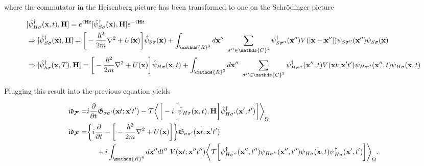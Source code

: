     where the commutator in the Heisenberg picture has been transformed to one on the Schr\"odinger picture 
    
    \begin{equation}
        \begin{split}
            & [\hat{\psi}^\dagger_{H \sigma}({\bf x}, t), {\bf H}] = e^{i{\bf H} t} [\hat{\psi}^\dagger_{ S \sigma}({\bf x}), {\bf H}] e^{-i{\bf H} t} \\
            & \Rightarrow [\hat{\psi}^\dagger_{ S \sigma}({\bf x}), {\bf H}] = \bigg[-\frac{\hbar^2}{2m} \nabla^2 + U({\bf x})\bigg] \hat{\psi}_{S \sigma}({\bf x})
            + \int_{\mathds{R}^3} d{\bf x}'' \blanky \sum_{\sigma'' \in \mathds{C}^2} \psi^\dagger_{S \sigma''}({\bf x}'') V(|{\bf x} - {\bf x}''|) \psi_{S \sigma''}({\bf x}'') \psi_{S \sigma}({\bf x}) \\
            & \Rightarrow [\hat{\psi}^\dagger_{ h \sigma}({\bf x}, T), {\bf H}] = \bigg[-\frac{\hbar^2}{2m} \nabla^2 + U({\bf x})\bigg] \hat{\psi}_{H \sigma}({\bf x}, t)
            + \int_{\mathds{R}^3} d{\bf x}'' \blanky \sum_{\sigma'' \in \mathds{C}^2} \psi^\dagger_{H \sigma''}({\bf x}'', t) V({\bf x}t; {\bf x}' t') \psi_{H \sigma''}({\bf x}'', t) \psi_{H \sigma}({\bf x}, t)
        \end{split}
    \end{equation}

Plugging this result into the previous equation yields

\begin{equation}
    \begin{split}
         \mathfrak{i}\mathfrak{d}_{\bm{\mathcal{F}}} = & i\frac{\partial}{\partial t} \mathfrak{G}_{\sigma \sigma'}({\bf x} t; {\bf x}' t') - \mathcal{T} \bigg\langle \bigg[-i \bigg[\hat{\psi}_{H \sigma}({\bf x}, t), {\bf H}\bigg] \hat{\psi}^\dagger_{H \sigma'}({\bf x}', t') \bigg] \bigg \rangle_{\Omega} \\
         \mathfrak{i}\mathfrak{d}_{\bm{\mathcal{F}}} = &\bigg\{ i\frac{\partial}{\partial t} - \bigg[-\frac{\hbar^2}{2m} \nabla^2 + U({\bf x})\bigg] \bigg\} \mathfrak{G}_{\sigma \sigma'}({\bf x} t; {\bf x}' t') \\
         & \blanky \blanky \blanky \blanky + i\int_{\mathds{R}^4} d{\bf x}'' dt'' \blanky V({\bf x}t; {\bf x}'' t'') \bigg\langle \mathcal{T} \bigg[ \psi^\dagger_{H \sigma''}({\bf x}'', t'') \psi_{H \sigma''}({\bf x}'', t'') \psi_{H \sigma}({\bf x}, t) \psi_{H \sigma}^\dagger({\bf x}', t') \bigg] \bigg \rangle_{\Omega}.
    \end{split}
    \label{NR_GF_Jellium_like_model}
\end{equation}

